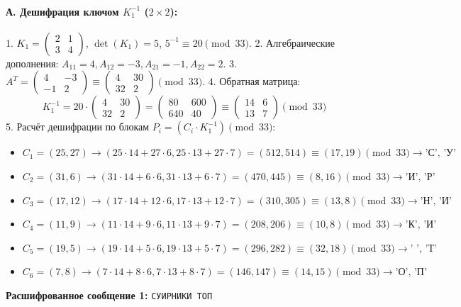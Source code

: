 \paragraph{А. Дешифрация ключом $K_1^{-1}$ ($2\times2$):}
1. $K_1 = \begin{pmatrix} 2 & 1 \\ 3 & 4 \end{pmatrix}$, $\det(K_1) = 5$, $5^{-1} \equiv 20 \pmod{33}$.
2. Алгебраические дополнения: $A_{11}=4, A_{12}=-3, A_{21}=-1, A_{22}=2$.
3. $A^T = \begin{pmatrix} 4 & -3 \\ -1 & 2 \end{pmatrix} \equiv \begin{pmatrix} 4 & 30 \\ 32 & 2 \end{pmatrix} \pmod{33}$.
4. Обратная матрица:
   \[
   K_1^{-1} = 20 \cdot \begin{pmatrix} 4 & 30 \\ 32 & 2 \end{pmatrix} = \begin{pmatrix} 80 & 600 \\ 640 & 40 \end{pmatrix} \equiv \begin{pmatrix} 14 & 6 \\ 13 & 7 \end{pmatrix} \pmod{33}
   \]
5. Расчёт дешифрации по блокам $P_i = (C_i \cdot K_1^{-1}) \pmod{33}$:
   \begin{itemize}
       \item $C_1 = (25, 27) \rightarrow (25\cdot14 + 27\cdot6, 25\cdot13 + 27\cdot7) = (512, 514) \equiv (17, 19) \pmod{33} \rightarrow \text{'С', 'У'}$
       \item $C_2 = (31, 6) \rightarrow (31\cdot14 + 6\cdot6, 31\cdot13 + 6\cdot7) = (470, 445) \equiv (8, 16) \pmod{33} \rightarrow \text{'И', 'Р'}$
       \item $C_3 = (17, 12) \rightarrow (17\cdot14 + 12\cdot6, 17\cdot13 + 12\cdot7) = (310, 305) \equiv (13, 8) \pmod{33} \rightarrow \text{'Н', 'И'}$
       \item $C_4 = (11, 9) \rightarrow (11\cdot14 + 9\cdot6, 11\cdot13 + 9\cdot7) = (208, 206) \equiv (10, 8) \pmod{33} \rightarrow \text{'К', 'И'}$
       \item $C_5 = (19, 5) \rightarrow (19\cdot14 + 5\cdot6, 19\cdot13 + 5\cdot7) = (296, 282) \equiv (32, 18) \pmod{33} \rightarrow \text{' ', 'Т'}$
       \item $C_6 = (7, 8) \rightarrow (7\cdot14 + 8\cdot6, 7\cdot13 + 8\cdot7) = (146, 147) \equiv (14, 15) \pmod{33} \rightarrow \text{'О', 'П'}$
   \end{itemize}
\textbf{Расшифрованное сообщение 1:} \texttt{СУИРНИКИ ТОП}

